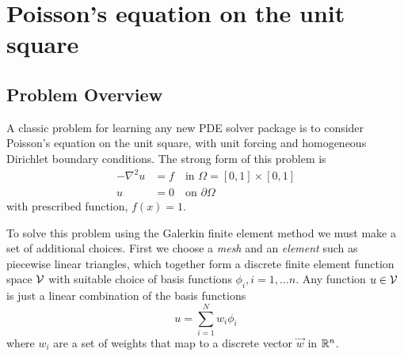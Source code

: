 %
%
%
%
%

\chapter{Poisson's equation on the unit square}
\label{cha:poiss-equat-unit}

\section{Problem Overview}

A classic problem for learning any new PDE solver package is to
consider  Poisson's equation on the unit square,  with unit
forcing and homogeneous Dirichlet boundary conditions.  The strong
form of this problem is
\begin{align}
-\nabla^2u &= f \quad\text{in } \Omega=[0,1]\times[0,1]\\
u &= 0 \quad\text{on } \partial\Omega
\end{align}
with  prescribed function, $f(x)=1$. 

To solve this problem using the Galerkin finite element method we must make a set of
additional choices. First we choose a \emph{mesh} and an \emph{element} such as
piecewise linear triangles, which together form a discrete finite
element function space $\mathcal{V}$ with suitable choice of basis
functions $\phi_{i}, i=1,\ldots n$. Any function $u\in\mathcal{V}$ is just a
linear combination of the basis functions
\begin{equation}
  \label{eq:6}
  u = \sum_{i=1}^{N} w_{i}\phi_{i}
\end{equation}
where $w_{i}$ are a set of weights that map to a discrete vector $\vec{w}$ in $\mathbb{R}^n{}$.


